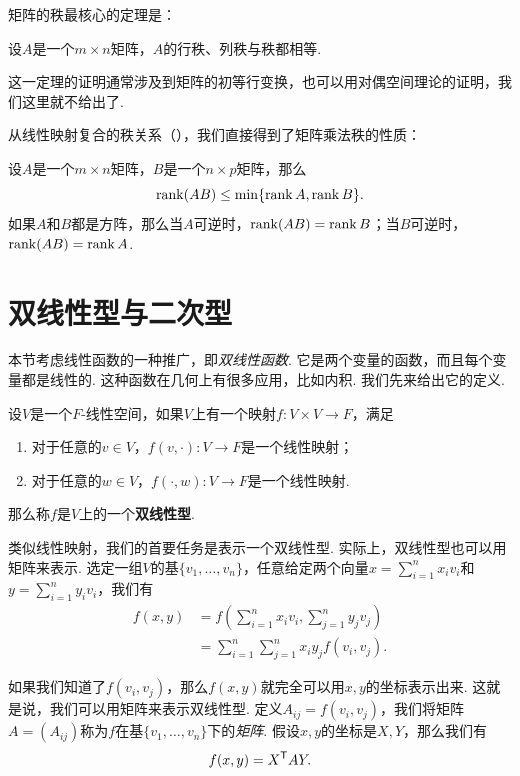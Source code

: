 矩阵的秩最核心的定理是：

\begin{theorem}\label{thm:rank}
    设$A$是一个$m\times n$矩阵，$A$的行秩、列秩与秩都相等. 
\end{theorem}

这一定理的证明通常涉及到矩阵的初等行变换，也可以用对偶空间理论的证明，我们这里就不给出了. 

从线性映射复合的秩关系（），我们直接得到了矩阵乘法秩的性质：

\begin{proposition}\label{prop:rank-multiplication}
    设$A$是一个$m\times n$矩阵，$B$是一个$n\times p$矩阵，那么
    \[\operatorname*{rank}(AB)\leq \min\{\operatorname*{rank} A,\operatorname*{rank} B\}.\]
如果$A$和$B$都是方阵，那么当$A$可逆时，$\operatorname*{rank}(AB)=\operatorname*{rank} B$；当$B$可逆时，$\operatorname*{rank}(AB)=\operatorname*{rank} A$.
\end{proposition}

\section{双线性型与二次型}

本节考虑线性函数的一种推广，即\emph{双线性函数}. 它是两个变量的函数，而且每个变量都是线性的. 这种函数在几何上有很多应用，比如内积. 我们先来给出它的定义. 

\begin{definition}[双线性型]\label{def:bilinear-form}
    设$V$是一个$F$-线性空间，如果$V$上有一个映射$f:V\times V\to F$，满足
    \begin{enumerate}
        \item 对于任意的$v\in V$，$f(v,\cdot):V\to F$是一个线性映射；
        \item 对于任意的$w\in V$，$f(\cdot,w):V\to F$是一个线性映射. 
    \end{enumerate}
    那么称$f$是$V$上的一个\textbf{双线性型}. 
\end{definition}

类似线性映射，我们的首要任务是表示一个双线性型. 实际上，双线性型也可以用矩阵来表示. 选定一组$V$的基$\{v_1,\dots,v_n\}$，任意给定两个向量$x=\sum_{i=1}^n x_iv_i$和$y=\sum_{i=1}^n y_iv_i$，我们有
\begin{align*}
    f(x,y)&=f\left(\sum_{i=1}^n x_iv_i,\sum_{j=1}^n y_jv_j\right)\\
    &=\sum_{i=1}^n\sum_{j=1}^n x_iy_jf(v_i,v_j).
\end{align*}

如果我们知道了$f(v_i,v_j)$，那么$f(x,y)$就完全可以用$x,y$的坐标表示出来. 这就是说，我们可以用矩阵来表示双线性型. 定义$A_{ij}=f(v_i,v_j)$，我们将矩阵$A=(A_{ij})$称为$f$在基$\{v_1,\dots,v_n\}$下的\emph{矩阵}. 假设$x,y$的坐标是$X,Y$，那么我们有
\[
    f(x,y)=X^{\mathsf{T}} AY.
\]

